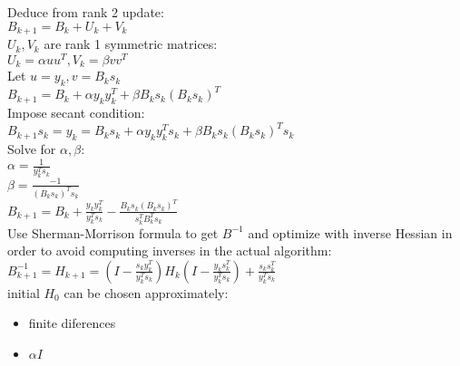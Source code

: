 \documentclass[8pt,letter]{article}
\begin{document}
\begin{multicols*}{2}

  Deduce from rank 2 update:\\
  $B_{k+1} = B_k + U_k + V_k$\\
  $U_k, V_k$ are rank 1 symmetric matrices:\\
  $U_k = \alpha uu^T, V_k = \beta vv^T$\\
  Let $u=y_k, v=B_ks_k$\\
  $B_{k+1} = B_k + \alpha y_k y_k^T + \beta B_k s_k (B_k s_k)^T$\\
  Impose secant condition:\\
  $B_{k+1} s_k = y_k = B_k s_k + \alpha y_k y_k^T s_k + \beta B_k s_k (B_k s_k)^T s_k$\\
  Solve for $\alpha, \beta$:\\
  $\alpha = \frac{1}{y_k^T s_k}$\\
  $\beta = \frac{-1}{(B_k s_k)^T s_k}$\\
  $B_{k+1} = B_k + \frac{y_k y_k^T}{y_k^T s_k} - \frac{B_k s_k (B_k s_k)^T}{s_k^T B_k^T s_k}$\\
  Use Sherman-Morrison formula to get $B^{-1}$ and optimize with inverse Hessian in order to avoid computing inverses in the actual algorithm:\\
  $B_{k+1}^{-1} = H_{k+1} = (I- \frac{s_k y_k^T}{y_k^T s_k})H_k(I- \frac{y_ks_k^T}{y_k^T s_k}) + \frac{s_k s_k^T}{y_k^T s_k}$\\
  
  initial $H_0$ can be chosen approximately:
  \begin{itemize}
  \item finite diferences
  \item $\alpha I$
  \end{itemize}
  

\end{multicols*}
\end{document}
